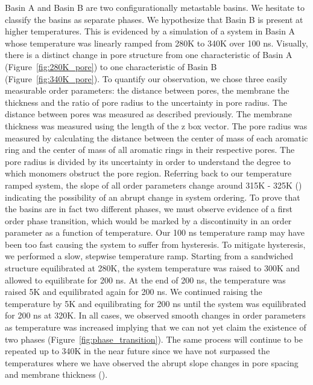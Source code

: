 Basin A and Basin B are two configurationally metastable basins. 
We hesitate to classify the basins as separate phases. We hypothesize
that Basin B is present at higher temperatures. This is evidenced by
a simulation of a system in Basin A whose temperature was linearly
ramped from 280K to 340K over 100 ns. Visually, there is a distinct
change in pore structure from one characteristic of Basin A 
(Figure~\ref{fig:280K_pore}) to one characteristic of Basin B 
(Figure~\ref{fig:340K_pore}). To quantify our observation, we chose 
three easily measurable order parameters: the distance between pores,
the membrane the thickness and the ratio of pore radius to the uncertainty
in pore radius. The distance between pores was measured as described 
previously. The membrane thickness was measured using the length of the
z box vector. The pore radius was measured by calculating the distance
between the center of mass of each aromatic ring and the center of mass
of all aromatic rings in their respective pores. The pore radius is divided by
its uncertainty in order to understand the degree to which monomers 
obstruct the pore region. Referring back to our temperature ramped system,
the slope of all order parameters change around 315K - 325K 
() indicating the 
possibility of an abrupt change in system ordering. To prove that the 
basins are in fact two different phases, we must observe evidence of a
first order phase transition, which would be marked by a discontinuity
in an order parameter as a function of temperature. Our 100 ns temperature
ramp may have been too fast causing the system to suffer from hysteresis. To mitigate
hysteresis, we performed a slow, stepwise temperature ramp. Starting from
a sandwiched structure equilibrated at 280K, the system temperature was raised to 
300K and allowed to equilibrate for 200 ns. At the end of 200 ns, the
temperature was raised 5K and equilibrated again for 200 ns. We continued raising the 
temperature by 5K and equilibrating for 200 ns until the system was 
equilibrated for 200 ns at 320K. In all cases, we observed smooth changes
in order parameters as temperature was increased implying that we can not yet
claim the existence of two phases (Figure~\ref{fig:phase_transition}). The same
process will continue to be repeated up to 340K in the near future since we have
not surpassed the temperatures where we have observed the abrupt slope changes
in pore spacing and membrane thickness ().

